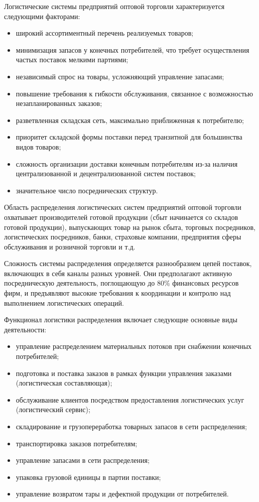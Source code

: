 Логистические системы предприятий оптовой торговли характеризуется следующими факторами:
\begin{itemize}
	\item широкий ассортиментный перечень реализуемых товаров;
	\item минимизация запасов у конечных потребителей, что требует осуществления частых поставок мелкими партиями;
	\item независимый спрос на товары, усложняющий управление запасами;
	\item повышение требования к гибкости обслуживания, связанное с возможностью незапланированных заказов;
	\item разветвленная складская сеть, максимально приближенная к потребителю;
	\item приоритет складской формы поставки перед транзитной для большинства видов товаров;
	\item сложность организации доставки конечным потребителям из-за наличия централизованной и децентрализованной систем поставок;
	\item значительное число посреднических структур.
\end{itemize}

Область распределения логистических систем предприятий оптовой торговли охватывает производителей  готовой продукции (сбыт начинается со складов готовой продукции), выпускающих товар на рынок сбыта, торговых посредников, логистических посредников, банки, страховые компании, предприятия сферы обслуживания и розничной торговли и т.д. 

Сложность системы распределения определяется разнообразием цепей поставок, включающих в себя каналы разных уровней.
Они предполагают активную посредническую деятельность, поглощающую до 80\% финансовых ресурсов фирм, и предъявляют высокие требования к координации и контролю над выполнением логистических операций.

Функционал логистики распределения включает следующие основные виды деятельности:
\begin{itemize}
	\item управление распределением материальных потоков при снабжении конечных потребителей;
	\item подготовка и поставка заказов в рамках функции управления заказами (логистическая составляющая);
	\item обслуживание клиентов посредством предоставления логистических услуг (логистический сервис);
	\item складирование и грузопереработка товарных запасов в сети распределения;
	\item транспортировка заказов потребителям;
	\item управление запасами в сети распределения;
	\item упаковка грузовой единицы в партии поставки;
	\item управление возвратом тары и дефектной продукции от потребителей.
\end{itemize}

